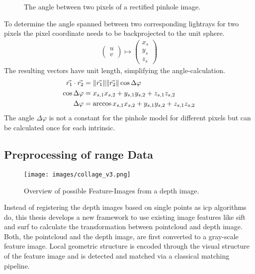 \documentclass[doktyp=marbeit,fontsize=12pt,sprache=english,draft=true,hausschrift=true,fleqn]{TUBAFarbeiten}
\DeclarePairedDelimiter{\abs}{\lVert}{\rVert} %
\begin{document}
\begin{figure}[H]
    
	\caption[Angle between two pixels in the pinhole model]{The angle between two pixels of a rectified pinhole image.}
\end{figure}
To determine the angle spanned between two corresponding lightrays for two pixels the pixel coordinate needs to be backprojected to the unit sphere.
\begin{align}
    \begin{pmatrix} u \\ v \end{pmatrix} \mapsto \begin{pmatrix} x_s \\ y_s \\ z_s \end{pmatrix}
\end{align}
The resulting vectors have unit length, simplifying the angle-calculation.
\begin{align}
    \vec{r_1} \cdot \vec{r_2} &= \abs{\vec{r_1}} \abs{\vec{r_2}} \cos \Delta\varphi \\
    \cos \Delta\varphi &= x_{s,1} x_{s,2} + y_{s,1} y_{s,2} + z_{s,1} z_{s,2} \\
    \Delta\varphi &= \arccos{x_{s,1} x_{s,2} + y_{s,1} y_{s,2} + z_{s,1} z_{s,2}}
\end{align}
The angle $\Delta\varphi$ is not a constant for the pinhole model for different pixels but can be calculated once for each intrinsic.

\subsection{Preprocessing of range Data}\label{preprocessing-of-range-data}

\begin{figure}[H]
    \centering
    \texttt{[image: images/collage\_v3.png]}
    \caption{Overview of possible Feature-Images from a depth image.}
\end{figure}

Instead of registering the depth images based on single points as \gls{icp} algorithms do, this thesis develops a new framework to use existing image features like \Gls{sift} and \Gls{surf} to calculate the transformation between pointcloud and depth image.
Both, the pointcloud and the depth image, are first converted to a gray-scale feature image.
Local geometric structure is encoded through the visual structure of the feature image and is detected and matched via a classical matching pipeline.
\end{document}
